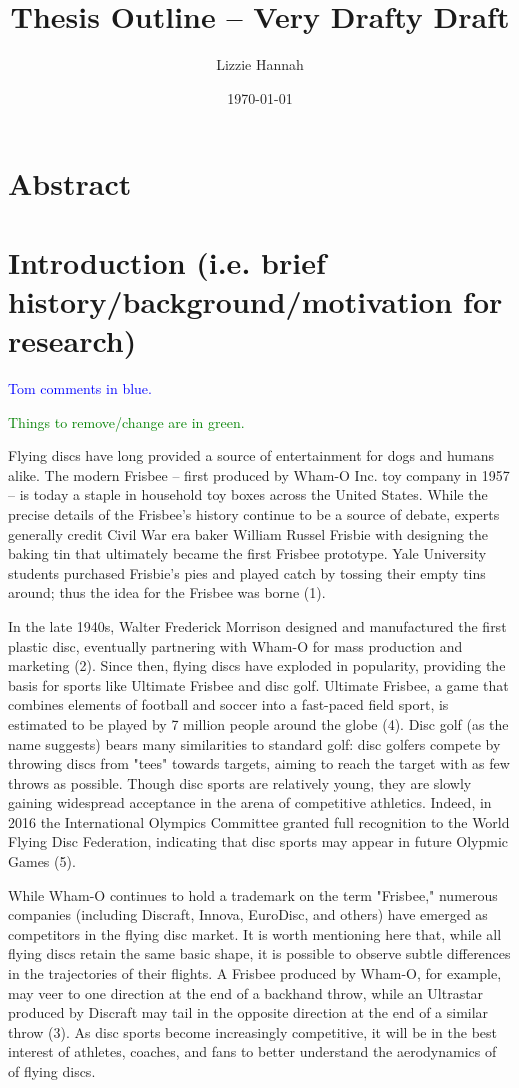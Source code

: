 \documentclass[a4paper,12pt, oneside]{article}
\title{Thesis Outline -- Very Drafty Draft}
\author{Lizzie Hannah}
\date{\today}
\newcommand{\blue}[1]{\textcolor{blue}{#1}}
\newcommand{\green}[1]{\textcolor{green}{#1}}
\begin{document}
\maketitle
\section{Abstract}
\section{Introduction (i.e. brief history/background/motivation for research)}

\blue{Tom comments in blue.}

\green{Things to remove/change are in green.}

Flying discs have long provided a source of entertainment for dogs and humans alike.  The modern Frisbee -- first produced by Wham-O Inc. toy company in 1957 -- is today a staple in household toy boxes across the United States.  While the precise details of the Frisbee's history continue to be a source of debate, experts generally credit Civil War era baker William Russel Frisbie with designing the baking tin that ultimately became the first Frisbee prototype.  Yale University students purchased Frisbie's pies and played catch by tossing their empty tins around; thus the idea for the Frisbee was borne (1).  

In the late 1940s, Walter Frederick Morrison designed and manufactured the first plastic disc, eventually partnering with Wham-O for mass production and marketing (2). Since then, flying discs have exploded in popularity, providing the basis for sports like Ultimate Frisbee and disc golf. Ultimate Frisbee, a game that combines elements of football and soccer into a fast-paced field sport, is estimated to be played by 7 million people around the globe (4).  Disc golf (as the name suggests) bears many similarities to standard golf: disc golfers compete by throwing discs from "tees" towards targets, aiming to reach the target with as few throws as possible. Though disc sports are relatively young, they are slowly gaining widespread acceptance in the arena of competitive athletics. Indeed, in 2016 the International Olympics Committee granted full recognition to the World Flying Disc Federation, indicating that disc sports may appear in future Olypmic Games (5).

While Wham-O continues to hold a trademark on the term "Frisbee," numerous companies (including Discraft, Innova, EuroDisc, and others) have emerged as competitors in the flying disc market. It is worth mentioning here that, while all flying discs retain the same basic shape, it is possible to observe subtle differences in the trajectories of their flights.  A Frisbee produced by Wham-O, for example, may veer to one direction at the end of a backhand throw, while an Ultrastar produced by Discraft may tail in the opposite direction at the end of a similar throw (3).  As disc sports become increasingly competitive, it will be in the best interest of athletes, coaches, and fans to better understand the aerodynamics of of flying discs.
\end{document}
